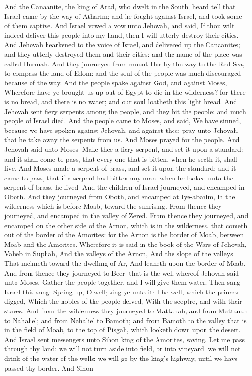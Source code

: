 And the Canaanite, the king of Arad, who dwelt in the South, heard tell that Israel came by the way of Atharim; and he fought against Israel, and took some of them captive. And Israel vowed a vow unto Jehovah, and said, If thou wilt indeed deliver this people into my hand, then I will utterly destroy their cities. And Jehovah hearkened to the voice of Israel, and delivered up the Canaanites; and they utterly destroyed them and their cities: and the name of the place was called Hormah.  And they journeyed from mount Hor by the way to the Red Sea, to compass the land of Edom: and the soul of the people was much discouraged because of the way. And the people spake against God, and against Moses, Wherefore have ye brought us up out of Egypt to die in the wilderness? for there is no bread, and there is no water; and our soul loatheth this light bread. And Jehovah sent fiery serpents among the people, and they bit the people; and much people of Israel died. And the people came to Moses, and said, We have sinned, because we have spoken against Jehovah, and against thee; pray unto Jehovah, that he take away the serpents from us. And Moses prayed for the people. And Jehovah said unto Moses, Make thee a fiery serpent, and set it upon a standard: and it shall come to pass, that every one that is bitten, when he seeth it, shall live. And Moses made a serpent of brass, and set it upon the standard: and it came to pass, that if a serpent had bitten any man, when he looked unto the serpent of brass, he lived.  And the children of Israel journeyed, and encamped in Oboth. And they journeyed from Oboth, and encamped at Iye-abarim, in the wilderness which is before Moab, toward the sunrising. From thence they journeyed, and encamped in the valley of Zered. From thence they journeyed, and encamped on the other side of the Arnon, which is in the wilderness, that cometh out of the border of the Amorites: for the Arnon is the border of Moab, between Moab and the Amorites. Wherefore it is said in the book of the Wars of Jehovah, Vaheb in Suphah, And the valleys of the Arnon,  And the slope of the valleys That inclineth toward the dwelling of Ar, And leaneth upon the border of Moab.  And from thence they journeyed to Beer: that is the well whereof Jehovah said unto Moses, Gather the people together, and I will give them water.  Then sang Israel this song: Spring up, O well; sing ye unto it:  The well, which the princes digged, Which the nobles of the people delved, With the sceptre, and with their staves. And from the wilderness they journeyed to Mattanah; and from Mattanah to Nahaliel; and from Nahaliel to Bamoth; and from Bamoth to the valley that is in the field of Moab, to the top of Pisgah, which looketh down upon the desert.  And Israel sent messengers unto Sihon king of the Amorites, saying, Let me pass through thy land: we will not turn aside into field, or into vineyard; we will not drink of the water of the wells: we will go by the king’s highway, until we have passed thy border. And Sihon 